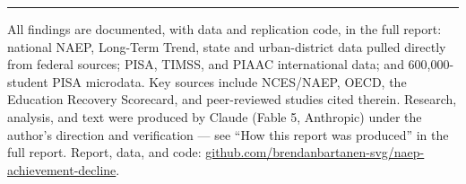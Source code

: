 \documentclass[10pt]{article}
\begin{document}
\vspace{4pt}\hrule\vspace{4pt}
{\footnotesize All findings are documented, with data and replication code, in the full report: national NAEP, Long-Term Trend, state and urban-district data pulled directly from federal sources; PISA, TIMSS, and PIAAC international data; and 600,000-student PISA microdata. Key sources include NCES/NAEP, OECD, the Education Recovery Scorecard, and peer-reviewed studies cited therein. Research, analysis, and text were produced by Claude (Fable 5, Anthropic) under the author's direction and verification --- see ``How this report was produced'' in the full report. Report, data, and code: \url{github.com/brendanbartanen-svg/naep-achievement-decline}.}
\end{document}
